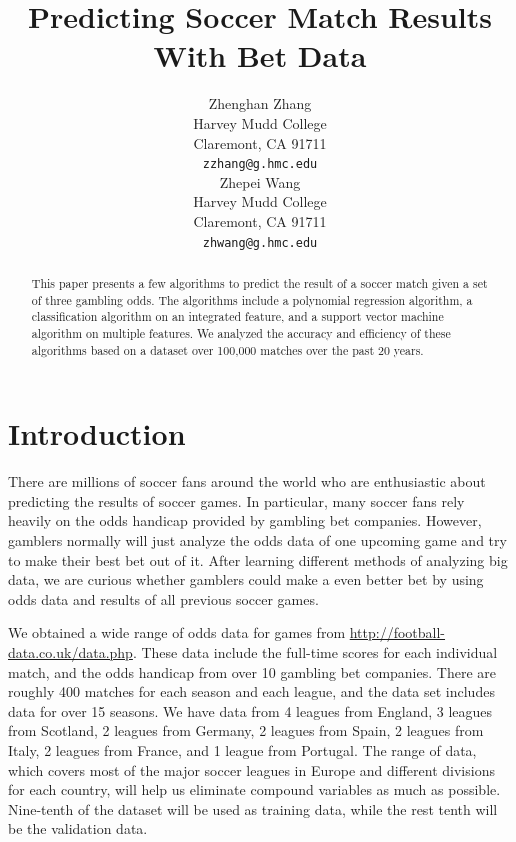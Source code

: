 \documentclass{article}
\title{Predicting Soccer Match Results With Bet Data}
\author{
	Zhenghan Zhang \\
	Harvey Mudd College\\
	Claremont, CA 91711 \\
	\texttt{zzhang@g.hmc.edu} \\
	 \And
	 Zhepei Wang \\
	 Harvey Mudd College \\
	 Claremont, CA 91711 \\
	 \texttt{zhwang@g.hmc.edu} \\
}
\begin{document}
	
	\maketitle
	\begin{abstract}
		This paper presents a few algorithms to predict the result of a soccer match given a set of three gambling odds. The algorithms include a polynomial regression algorithm, a classification algorithm on an integrated feature, and a support vector machine algorithm on multiple features. We analyzed the accuracy and efficiency of these algorithms based on a dataset over 100,000 matches over the past 20 years.
	\end{abstract}
	
	\section{Introduction}
	There are millions of soccer fans around the world who are enthusiastic about predicting the results of soccer games. In particular, many soccer fans rely heavily on the odds handicap provided by gambling bet companies. However, gamblers normally will just analyze the odds data of one upcoming game and try to make their best bet out of it. After learning different methods of analyzing big data, we are curious whether gamblers could make a even better bet by using odds data and results of all previous soccer games.
	
	We obtained a wide range of odds data for games from \url{http://football-data.co.uk/data.php}. These data include the full-time scores for each individual match, and the odds handicap from over 10 gambling bet companies. There are roughly 400 matches for each season and each league, and the data set includes data for over 15 seasons. We have data from 4 leagues from England, 3 leagues from Scotland, 2 leagues from Germany, 2 leagues from Spain, 2 leagues from Italy, 2 leagues from France, and 1 league from Portugal. The range of data, which covers most of the major soccer leagues in Europe and different divisions for each country, will help us eliminate compound variables  as much as possible. Nine-tenth of the dataset will be used as training data, while the rest tenth will be the validation data.
	
\end{document}
